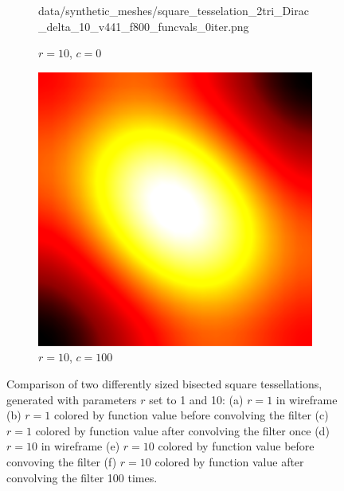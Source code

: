 \begin{figure}[ht]
\begin{subfigure}[b]{0.32\linewidth}
		{data/synthetic_meshes/square_tesselation_2tri_Dirac_delta_10_v441_f800_funcvals_0iter.png}
		\caption{$r=10$, $c=0$}\label{fig:sq2.e}
	\end{subfigure}
	\begin{subfigure}[b]{0.32\linewidth}
		\includegraphics[width=\linewidth]
		{data/synthetic_meshes/square_tesselation_2tri_Dirac_delta_10_v441_f800_funcvals_100iter.png}
		\caption{$r=10$, $c=100$}\label{fig:sq2.f}
	\end{subfigure}
	\caption[Six views, comparing two differently sized of bisected square tessellations]{Comparison of two differently sized bisected square tessellations, generated with parameters $r$ set to 1 and 10: (a) $r=1$ in wireframe (b) $r=1$ colored by function value before convolving the filter (c) $r=1$ colored by function value after convolving the filter once (d) $r=10$ in wireframe (e) $r=10$ colored by function value before convoving the filter (f) $r=10$ colored by function value after convolving the filter 100 times.}
	\label{fig:sq2}
\end{figure}
